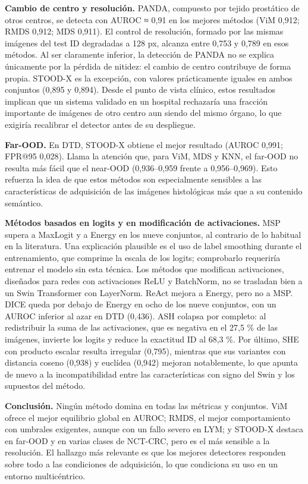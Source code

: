 \textbf{Cambio de centro y resolución.} PANDA, compuesto por tejido
prostático de otros centros, se detecta con AUROC ≈ 0,91 en los mejores
métodos (ViM 0,912; RMDS 0,912; MDS 0,911). El control de resolución,
formado por las mismas imágenes del test ID degradadas a 128 px, alcanza
entre 0,753 y 0,789 en esos métodos. Al ser claramente inferior, la
detección de PANDA no se explica únicamente por la pérdida de nitidez:
el cambio de centro contribuye de forma propia. STOOD-X es la excepción,
con valores prácticamente iguales en ambos conjuntos (0,895 y 0,894).
Desde el punto de vista clínico, estos resultados implican que un
sistema validado en un hospital rechazaría una fracción importante de
imágenes de otro centro aun siendo del mismo órgano, lo que exigiría
recalibrar el detector antes de su despliegue.

\textbf{Far-OOD.} En DTD, STOOD-X obtiene el mejor resultado (AUROC
0,991; FPR@95 0,028). Llama la atención que, para ViM, MDS y KNN, el
far-OOD no resulta más fácil que el near-OOD (0,936--0,959 frente a
0,956--0,969). Esto refuerza la idea de que estos métodos son
especialmente sensibles a las características de adquisición de las
imágenes histológicas más que a su contenido semántico.

\textbf{Métodos basados en logits y en modificación de activaciones.}
MSP supera a MaxLogit y a Energy en los nueve conjuntos, al contrario de
lo habitual en la literatura. Una explicación plausible es el uso de
label smoothing durante el entrenamiento, que comprime la escala de los
logits; comprobarlo requeriría entrenar el modelo sin esta técnica. Los
métodos que modifican activaciones, diseñados para redes con
activaciones ReLU y BatchNorm, no se trasladan bien a un Swin
Transformer con LayerNorm. ReAct mejora a Energy, pero no a MSP. DICE
queda por debajo de Energy en ocho de los nueve conjuntos, con un AUROC
inferior al azar en DTD (0,436). ASH colapsa por completo: al
redistribuir la suma de las activaciones, que es negativa en el 27,5 \%
de las imágenes, invierte los logits y reduce la exactitud ID al 68,3
\%. Por último, SHE con producto escalar resulta irregular (0,795),
mientras que sus variantes con distancia coseno (0,938) y euclídea
(0,942) mejoran notablemente, lo que apunta de nuevo a la
incompatibilidad entre las características con signo del Swin y los
supuestos del método.

\textbf{Conclusión.} Ningún método domina en todas las métricas y
conjuntos. ViM ofrece el mejor equilibrio global en AUROC; RMDS, el
mejor comportamiento con umbrales exigentes, aunque con un fallo severo
en LYM; y STOOD-X destaca en far-OOD y en varias clases de NCT-CRC, pero
es el más sensible a la resolución. El hallazgo más relevante es que los
mejores detectores responden sobre todo a las condiciones de
adquisición, lo que condiciona su uso en un entorno multicéntrico.

